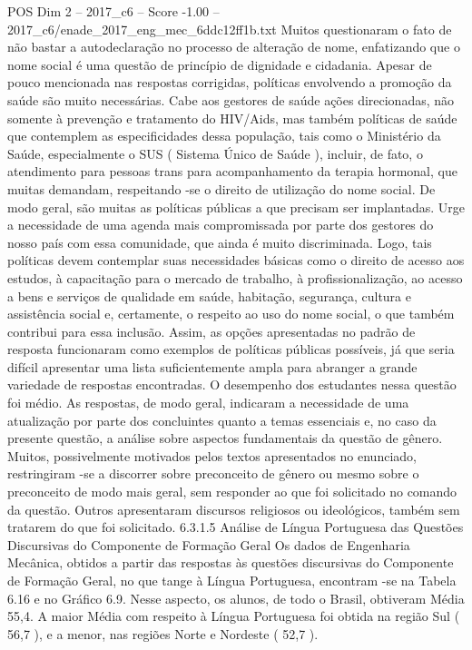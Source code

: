 \begin{textsample}{POS Dim 2 – 2017\_c6 – Score -1.00 – 2017\_c6/enade\_2017\_eng\_mec\_6ddc12ff1b.txt}
Muitos questionaram o fato de não bastar a autodeclaração no processo de alteração de nome, enfatizando que o nome social é uma questão de princípio de dignidade e cidadania.
Apesar de pouco mencionada nas respostas corrigidas, políticas envolvendo a promoção da saúde são muito necessárias.
Cabe aos gestores de saúde ações direcionadas, não somente à prevenção e tratamento do HIV/Aids, mas também políticas de saúde que contemplem as especificidades dessa população, tais como o Ministério da Saúde, especialmente o SUS ( Sistema Único de Saúde ), incluir, de fato, o atendimento para pessoas trans para acompanhamento da terapia hormonal, que muitas demandam, respeitando -se o direito de utilização do nome social.
De modo geral, são muitas as políticas públicas a que precisam ser implantadas.
Urge a necessidade de uma agenda mais compromissada por parte dos gestores do nosso país com essa comunidade, que ainda é muito discriminada.
Logo, tais políticas devem contemplar suas necessidades básicas como o direito de acesso aos estudos, à capacitação para o mercado de trabalho, à profissionalização, ao acesso a bens e serviços de qualidade em saúde, habitação, segurança, cultura e assistência social e, certamente, o respeito ao uso do nome social, o que também contribui para essa inclusão.
Assim, as opções apresentadas no padrão de resposta funcionaram como exemplos de políticas públicas possíveis, já que seria difícil apresentar uma lista suficientemente ampla para abranger a grande variedade de respostas encontradas.
O desempenho dos estudantes nessa questão foi médio.
As respostas, de modo geral, indicaram a necessidade de uma atualização por parte dos concluintes quanto a temas essenciais e, no caso da presente questão, a análise sobre aspectos fundamentais da questão de gênero.
Muitos, possivelmente motivados pelos textos apresentados no enunciado, restringiram -se a discorrer sobre preconceito de gênero ou mesmo sobre o preconceito de modo mais geral, sem responder ao que foi solicitado no comando da questão.
Outros apresentaram discursos religiosos ou ideológicos, também sem tratarem do que foi solicitado. 6.3.1.5 Análise de Língua Portuguesa das Questões Discursivas do Componente de Formação Geral Os dados de Engenharia Mecânica, obtidos a partir das respostas às questões discursivas do Componente de Formação Geral, no que tange à Língua Portuguesa, encontram -se na Tabela 6.16 e no Gráfico 6.9.
Nesse aspecto, os alunos, de todo o Brasil, obtiveram Média 55,4.
A maior Média com respeito à Língua Portuguesa foi obtida na região Sul ( 56,7 ), e a menor, nas regiões Norte e Nordeste ( 52,7 ).

\end{textsample}
